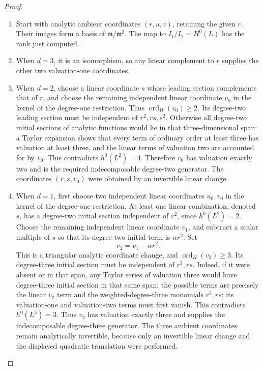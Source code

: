 \begin{proof}
\begin{enumerate}[label={$\langle1\rangle$\arabic*.},leftmargin=*]
\paragraph{3. Retaining the given coordinate using only permitted changes}

\item Start with analytic ambient coordinates \((r,u,v)\), retaining
the given \(r\). Their images form a basis of
\(\mathfrak m/\mathfrak m^2\). The map to
\(I_1/I_2=H^0(L)\) has the rank just computed.

\item When \(d=3\), it is an isomorphism, so any linear complement
to \(r\) supplies the other two valuation-one coordinates.

\item When \(d=2\), choose a linear coordinate \(s\) whose
leading section complements that of \(r\), and choose the
remaining independent linear coordinate \(v_0\) in the
kernel of the degree-one restriction. Thus
\(\operatorname{ord}_H(v_0)\ge2\). Its degree-two leading
section must be independent of \(r^2,rs,s^2\). Otherwise
all degree-two initial sections of analytic functions would
lie in that three-dimensional span: a Taylor expansion shows
that every term of ordinary order at least three has valuation
at least three, and the linear terms of valuation two are
accounted for by \(v_0\). This contradicts
\(h^0(L^2)=4\). Therefore \(v_0\) has valuation exactly
two and is the required indecomposable degree-two generator.
The coordinates \((r,s,v_0)\) were obtained by an invertible
linear change.

\item When \(d=1\), first choose two independent linear coordinates
\(u_0,v_0\) in the kernel of the degree-one restriction.
At least one linear combination, denoted \(s\), has a
degree-two initial section independent of \(r^2\), since
\(h^0(L^2)=2\). Choose the remaining independent linear
coordinate \(v_1\), and subtract a scalar multiple of \(s\)
so that its degree-two initial term is \(\alpha r^2\).
Set
\[
                         v_2=v_1-\alpha r^2.
\]
This is a triangular analytic coordinate change, and
\(\operatorname{ord}_H(v_2)\ge3\). Its degree-three
initial section must be independent of \(r^3,rs\).
Indeed, if it were absent or in that span, any Taylor series
of valuation three would have degree-three initial section
in that same span: the possible terms are precisely the
linear \(v_2\) term and the weighted-degree-three monomials
\(r^3,rs\); its valuation-one and valuation-two terms
must first vanish. This contradicts \(h^0(L^3)=3\).
Thus \(v_2\) has valuation exactly three and supplies the
indecomposable degree-three generator. The three ambient
coordinates remain analytically invertible, because only
an invertible linear change and the displayed quadratic
translation were performed.


\end{enumerate}
\end{proof}
